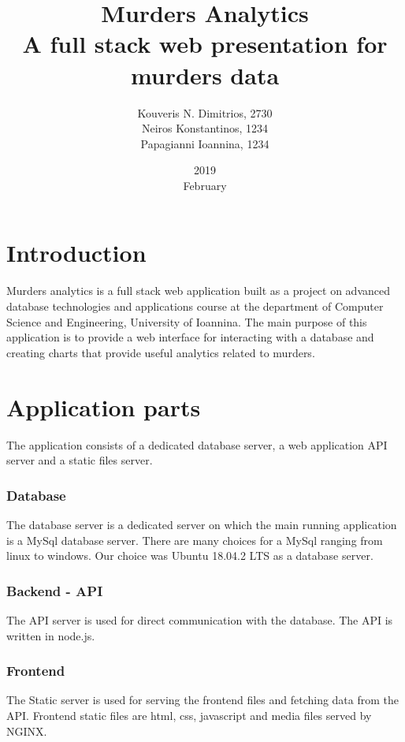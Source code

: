 \documentclass[10pt,a4paper]{article}
\title{%
  \huge Murders Analytics \\
\large A full stack web presentation for murders data}
\author{Kouveris N. Dimitrios, 2730 \\
Neiros Konstantinos, 1234 \\
Papagianni Ioannina, 1234}
\date{2019\\February}
\begin{document}
\maketitle
\newpage

\doublespacing

\tableofcontents
\singlespacing

\newpage

\section{Introduction}
Murders analytics is a full stack web application built as a project on advanced
database technologies and applications course at the department of Computer Science
and Engineering, University of Ioannina. The main purpose of this application is
to provide a web interface for interacting with a database and creating charts
that provide useful analytics related to murders.

\section{Application parts}
The application consists of a dedicated database server, a web application API
server and a static files server.

\subsubsection{Database}
The database server is a dedicated server on which the main running application
is a MySql database server. There are many choices for a MySql ranging from linux
to windows. Our choice was Ubuntu 18.04.2 LTS as a database server.

\subsubsection{Backend - API}
The API server is used for direct communication with the database. The API 
is written in node.js.

\subsubsection{Frontend}
The Static server is used for serving the frontend files and fetching data from
the API. Frontend static files are html, css, javascript and media files served by NGINX.
\end{document}
